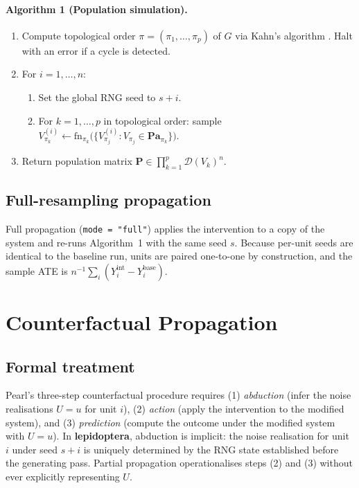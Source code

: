 \documentclass[12pt,a4paper]{article}
\newcommand{\pkg}[1]{\textbf{#1}}
\newcommand{\code}[1]{\texttt{#1}}
\begin{document}
\paragraph{Algorithm 1 (Population simulation).}
\begin{enumerate}
  \item Compute topological order $\pi = (\pi_1,\ldots,\pi_p)$ of $G$ via
        Kahn's algorithm \citep{kahn1962topological}. Halt with an error if
        a cycle is detected.
  \item For $i = 1,\ldots,n$:
        \begin{enumerate}
          \item Set the global RNG seed to $s + i$.
          \item For $k = 1,\ldots,p$ in topological order: sample
                $V_{\pi_k}^{(i)} \leftarrow
                \mathrm{fn}_{\pi_k}\!\bigl(\{V_{\pi_j}^{(i)} :
                V_{\pi_j}\in\mathbf{Pa}_{\pi_k}\}\bigr)$.
        \end{enumerate}
  \item Return population matrix $\mathbf{P}\in\prod_{k=1}^p\mathcal{D}(V_k)^n$.
\end{enumerate}

\subsection{Full-resampling propagation}
\label{sec:full_prop}

Full propagation (\code{mode = "full"}) applies the intervention to a copy of the
system and re-runs Algorithm~1 with the same seed $s$. Because per-unit seeds are
identical to the baseline run, units are paired one-to-one by construction, and
the sample ATE is $n^{-1}\sum_i (Y_i^{\mathrm{int}} - Y_i^{\mathrm{base}})$.

\section{Counterfactual Propagation}
\label{sec:counterfactual}

\subsection{Formal treatment}
\label{sec:cf_formal}

Pearl's three-step counterfactual procedure \citep{pearl2009causality} requires
(1) \emph{abduction} (infer the noise realisations $U = u$ for unit $i$),
(2) \emph{action} (apply the intervention to the modified system), and
(3) \emph{prediction} (compute the outcome under the modified system with $U = u$).
In \pkg{lepidoptera}, abduction is implicit: the noise realisation for unit $i$
under seed $s + i$ is uniquely determined by the RNG state established before the
generating pass. Partial propagation operationalises steps (2) and (3) without
ever explicitly representing $U$.
\end{document}
